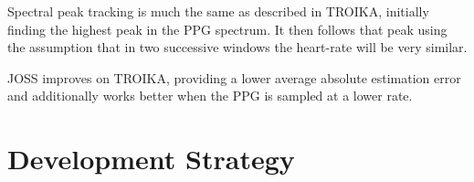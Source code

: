 \documentclass[12pt,a4paper,twoside,openany]{report}
\begin{document}
Spectral peak tracking is much the same as described in TROIKA, initially
finding the highest peak in the PPG spectrum. It then follows that peak using
the assumption that in two successive windows the heart-rate will be very
similar.

JOSS improves on TROIKA, providing a lower average absolute estimation error
and additionally works better when the PPG is sampled at a lower rate.


%
%
%
%
%
%
%
%



\section{Development Strategy}
\end{document}

